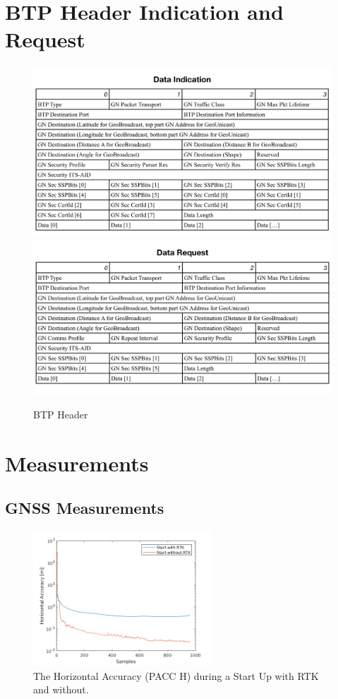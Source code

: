 \chapter{BTP Header Indication and Request} \label{app:BTPHeaderIndicationRequest}

\begin{figure}[htb]
	\centering
	\includegraphics[width=1\textwidth]{images/BTPHeaderIndication}
	\includegraphics[width=1\textwidth]{images/BTPHeaderRequest}
	\caption{BTP Header}
	\label{fig:BTP_Indication}
	\cite{CohdaWirelessETSA}
\end{figure}

\clearpage
\newpage

\chapter{Measurements}
\section{GNSS Measurements}
\begin{figure}[htb]
	\centering
	\includegraphics[width=0.6\textwidth]{images/AccuracyStart}
	\caption{The Horizontal Accuracy (PACC H) during a Start Up with RTK and without.}
	\label{fig:AccSt}
\end{figure}

